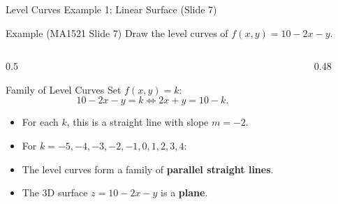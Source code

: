 \documentclass[aspectratio=169,10pt]{beamer}
\begin{document}
\begin{frame}{Level Curves Example 1: Linear Surface (Slide 7)}
  \begin{exampleblock}{Example (MA1521 Slide 7)}
    Draw the level curves of $f(x, y) = 10 - 2x - y$.
  \end{exampleblock}

  \begin{columns}[T]
    \begin{column}{0.5\textwidth}
      \begin{block}{Family of Level Curves}
        \small
        Set $f(x, y) = k$:
        \[
          10 - 2x - y = k \iff 2x + y = 10 - k.
        \]
        \begin{itemize}
          \item For each $k$, this is a straight line with slope $m = -2$.
          \item For $k = -5, -4, -3, -2, -1, 0, 1, 2, 3, 4$:
          \item The level curves form a family of \textbf{parallel straight lines}.
          \item The 3D surface $z = 10 - 2x - y$ is a \textbf{plane}.
        \end{itemize}
      \end{block}
    \end{column}

    \begin{column}{0.48\textwidth}
      \centering
    \end{column}
  \end{columns}
\end{frame}
\end{document}
